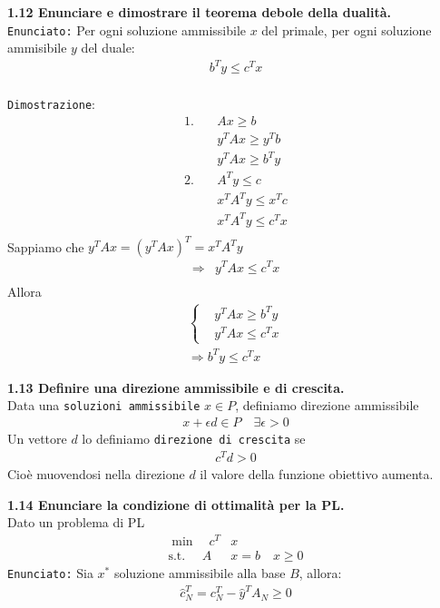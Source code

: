 \documentclass[a4paper,11pt]{article}
\newcommand{\domanda}[2]{%
  \vspace{0.6em}
  \noindent\textbf{#1}\\[0.2em]
  \noindent#2
  \vspace{1em}
  \par
}
\begin{document}
\domanda{1.12 \quad Enunciare e dimostrare il teorema debole della dualità.}{
\texttt{Enunciato:} Per ogni soluzione ammissibile $x$ del primale, per ogni soluzione ammisibile $y$ del duale:
\begin{align*}
    b^Ty \leq c^T x
\end{align*}
\vspace{1px}\\
\texttt{Dimostrazione}:
\begin{align*}
    1. \quad &Ax \geq b\\
    &y^TAx \geq y^T b \\
    &y^TAx \geq b^T y\\
    2. \quad &A^T y \leq c\\
    &x^T A^T y \leq x^T c\\
    &x^T A^T y \leq c^T x\\
\end{align*}
Sappiamo che $y^TAx = (y^TAx)^T = x^T A^T y$
\begin{align*}
    \Rightarrow &y^TAx \leq c^T x\\
\end{align*}
Allora
\begin{align*}
    \begin{cases}
    &y^TAx \geq b^Ty \\
    &y^TAx \leq c^T x
    \end{cases}\\
    \Rightarrow b^Ty \leq c^Tx
\end{align*}
}

\domanda{1.13 \quad Definire una direzione ammissibile e di crescita.}{
Data una \texttt{soluzioni ammissibile} $x \in P$, definiamo direzione ammissibile
\begin{align*}
    x + \epsilon d \in P \quad \exists \epsilon > 0
\end{align*}
Un vettore $d$ lo definiamo \texttt{direzione di crescita} se 
\begin{align*}
    c^T d > 0
\end{align*}
Cioè muovendosi nella direzione $d$ il valore della funzione obiettivo aumenta.
}

\domanda{1.14 \quad Enunciare la condizione di ottimalità per la PL.}{
Dato un problema di PL
\begin{align*}
    \min \quad c^T &x \\
    \text{s.t. } \quad A&x=b \quad x \geq 0
\end{align*}
\texttt{Enunciato:} Sia $x^*$ soluzione ammissibile alla base $B$, allora:
\begin{align*}
    \hat{c}_N^T=c_N^T- \hat{y}^T A_N \geq 0 
\end{align*}
}
\end{document}
